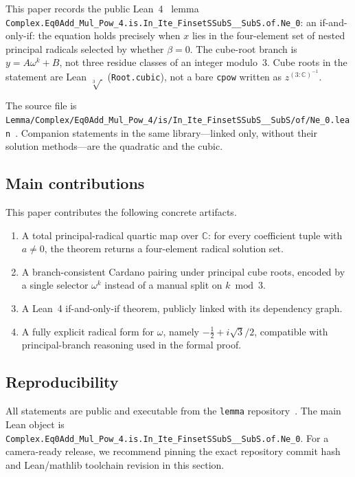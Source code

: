 \documentclass[11pt,a4paper]{article}
\newcommand{\C}{\mathbb{C}}
\begin{document}
This paper records the public Lean~4~\cite{moura2021lean4} lemma
\nolinkurl{Complex.Eq0Add_Mul_Pow_4.is.In_Ite_FinsetSSubS__SubS.of.Ne_0}:
an if-and-only-if: the equation holds precisely when \(x\) lies in the four-element set of nested principal radicals selected by whether \(\beta=0\).
The cube-root branch is \(y=A\omega^{k}+B\), not three residue classes of an integer modulo~3.
Cube roots in the statement are Lean \(\sqrt[3]{\,}\) (\texttt{Root.cubic}), not a bare \texttt{cpow} written as \(z^{(3:\C)^{-1}}\).

The source file is
\nolinkurl{Lemma/Complex/Eq0Add_Mul_Pow_4/is/In_Ite_FinsetSSubS__SubS/of/Ne_0.lean}~\cite{lemma_repo}.
Companion statements in the same library---linked only, without their solution methods---are the quadratic and the cubic.

\subsection{Main contributions}
\label{sec:contrib}

This paper contributes the following concrete artifacts.
\begin{enumerate}[leftmargin=1.3em,itemsep=0.2em]
  \item A total principal-radical quartic map over \(\C\): for every coefficient tuple with \(a\neq 0\), the theorem returns a four-element radical solution set.
  \item A branch-consistent Cardano pairing under principal cube roots, encoded by a single selector \(\omega^k\) instead of a manual split on \(k\bmod 3\).
  \item A Lean~4 if-and-only-if theorem, publicly linked with its dependency graph.
  \item A fully explicit radical form for \(\omega\), namely \(-\tfrac12+i\sqrt{3}/2\), compatible with principal-branch reasoning used in the formal proof.
\end{enumerate}

\subsection{Reproducibility}
\label{sec:repro}

All statements are public and executable from the \nolinkurl{lemma} repository~\cite{lemma_repo}.
The main Lean object is
\nolinkurl{Complex.Eq0Add_Mul_Pow_4.is.In_Ite_FinsetSSubS__SubS.of.Ne_0}.
For a camera-ready release, we recommend pinning the exact repository commit hash and Lean/mathlib toolchain revision in this section.
\end{document}
